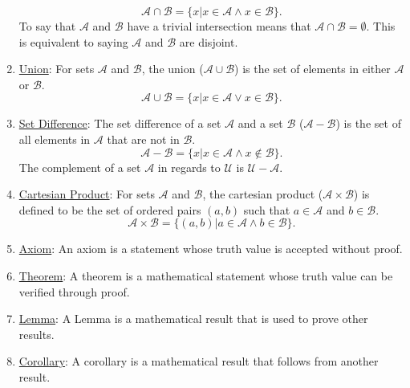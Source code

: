 \documentclass{hw}
\newcommand{\Define}[1]{\item\underline{#1}:}
\newcommand{\set}[1]{\mathcal{#1}}
\newcommand{\setA}{\mathcal{A}}
\newcommand{\setB}{\mathcal{B}}
\newcommand{\setU}{\set{U}}
\begin{document}
\begin{enumerate}
\[\setA\cap\setB = \{x|x\in\setA\wedge x\in\setB\}.\]
To say that $\setA$ and $\setB$ have a trivial intersection means that $\setA\cap\setB=\emptyset$. This is equivalent to saying $\setA$ and $\setB$ are disjoint.
\Define{Union} For sets $\setA$ and $\setB$, the union ($\setA\cup\setB$) is the set of elements in either $\setA$ or $\setB$.
\[\setA\cup\setB = \{x|x\in\setA\vee x\in\setB\}.\]
\Define{Set Difference} The set difference of a set $\setA$ and a set $\setB$ ($\setA-\setB$) is the set of all elements in $\setA$ that are not in $\setB$.
\[\setA-\setB=\{x|x\in\setA\wedge x\notin\setB\}.\]
The complement of a set $\setA$ in regards to $\setU$ is $\setU-\setA$.
\Define{Cartesian Product} For sets $\setA$ and $\setB$, the cartesian product ($\setA\times\setB$) is defined to be the set of ordered pairs $(a,b)$ such that $a\in\setA$ and $b\in\setB$.
\[\setA\times\setB=\{(a,b)|a\in\setA\wedge b\in\setB\}.\]
\Define{Axiom} An axiom is a statement whose truth value is accepted without proof.
\Define{Theorem} A theorem is a mathematical statement whose truth value can be verified through proof.
\Define{Lemma} A Lemma is a mathematical result that is used to prove other results.
\Define{Corollary} A corollary is a mathematical result that follows from another result.
\end{enumerate}

\newpage
\end{document}
